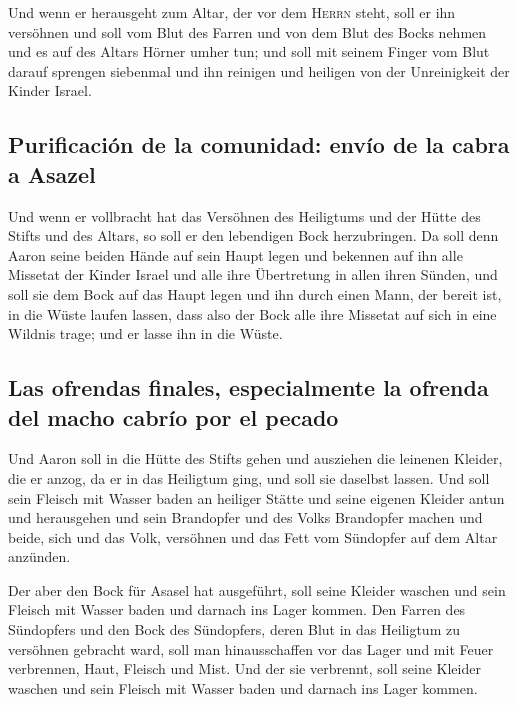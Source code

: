  Und wenn er herausgeht zum Altar, der vor dem
\textsc{Herrn} steht, soll er ihn versöhnen und soll vom Blut des Farren
und von dem Blut des Bocks nehmen und es auf des Altars Hörner umher
tun;  und soll mit seinem Finger vom Blut darauf sprengen
siebenmal und ihn reinigen und heiligen von der Unreinigkeit der Kinder
Israel.

\hypertarget{purificaciuxf3n-de-la-comunidad-envuxedo-de-la-cabra-a-asazel}{%
\subsection{Purificación de la comunidad: envío de la cabra a
Asazel}\label{purificaciuxf3n-de-la-comunidad-envuxedo-de-la-cabra-a-asazel}}

 Und wenn er vollbracht hat das Versöhnen des Heiligtums
und der Hütte des Stifts und des Altars, so soll er den lebendigen Bock
herzubringen.  Da soll denn Aaron seine beiden Hände auf
sein Haupt legen und bekennen auf ihn alle Missetat der Kinder Israel
und alle ihre Übertretung in allen ihren Sünden, und soll sie dem Bock
auf das Haupt legen und ihn durch einen Mann, der bereit ist, in die
Wüste laufen lassen,  dass also der Bock alle ihre
Missetat auf sich in eine Wildnis trage; und er lasse ihn in die Wüste.

\hypertarget{las-ofrendas-finales-especialmente-la-ofrenda-del-macho-cabruxedo-por-el-pecado}{%
\subsection{Las ofrendas finales, especialmente la ofrenda del macho
cabrío por el
pecado}\label{las-ofrendas-finales-especialmente-la-ofrenda-del-macho-cabruxedo-por-el-pecado}}

 Und Aaron soll in die Hütte des Stifts gehen und
ausziehen die leinenen Kleider, die er anzog, da er in das Heiligtum
ging, und soll sie daselbst lassen.  Und soll sein
Fleisch mit Wasser baden an heiliger Stätte und seine eigenen Kleider
antun und herausgehen und sein Brandopfer und des Volks Brandopfer
machen und beide, sich und das Volk, versöhnen  und das
Fett vom Sündopfer auf dem Altar anzünden.

 Der aber den Bock für Asasel hat ausgeführt, soll seine
Kleider waschen und sein Fleisch mit Wasser baden und darnach ins Lager
kommen.  Den Farren des Sündopfers und den Bock des
Sündopfers, deren Blut in das Heiligtum zu versöhnen gebracht ward, soll
man hinausschaffen vor das Lager und mit Feuer verbrennen, Haut, Fleisch
und Mist.  Und der sie verbrennt, soll seine Kleider
waschen und sein Fleisch mit Wasser baden und darnach ins Lager kommen.

